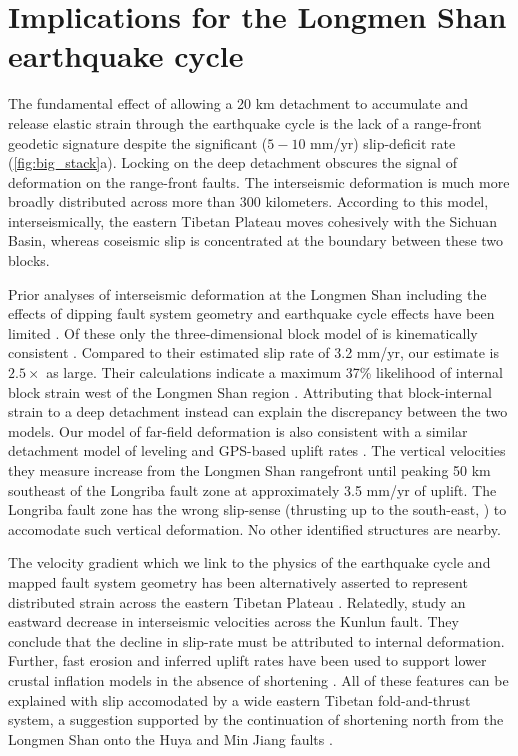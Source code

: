 \documentclass[12pt]{article}
\begin{document}
\section{Implications for the Longmen Shan earthquake cycle}
The fundamental effect of allowing a 20 km detachment to accumulate and release elastic strain through the earthquake cycle is the lack of a range-front geodetic signature despite the significant ($5-10$ mm/yr) slip-deficit rate (\ref{fig:big_stack}a). Locking on the deep detachment obscures the signal of deformation on the range-front faults. The interseismic deformation is much more broadly distributed across more than 300 kilometers. According to this model, interseismically, the eastern Tibetan Plateau moves cohesively with the Sichuan Basin, whereas coseismic slip is concentrated at the boundary between these two blocks.

Prior analyses of interseismic deformation at the Longmen Shan including the effects of dipping fault system geometry and earthquake cycle effects have been limited \citep{Loveless2011, Qi2011, Hao2014}. Of these only the three-dimensional block model of \citet{Loveless2011} is kinematically consistent \citep{minster87,mccaffrey02,Meade2005}. Compared to their estimated slip rate of 3.2 mm/yr, our estimate is $2.5 \times$ as large.  Their calculations indicate a maximum 37\% likelihood of internal block strain west of the Longmen Shan region \citep{Loveless2011}. Attributing that block-internal strain to a deep detachment instead can explain the discrepancy between the two models. Our model of far-field deformation is also consistent with a similar detachment model of leveling and GPS-based uplift rates \citep{Hao2014}. The vertical velocities they measure increase from the Longmen Shan rangefront until peaking 50 km southeast of the Longriba fault zone at approximately 3.5 mm/yr of uplift. The Longriba fault zone has the wrong slip-sense (thrusting up to the south-east, \citep{Ren2013}) to accomodate such vertical deformation. No other identified structures are nearby. 

The velocity gradient which we link to the physics of the earthquake cycle and mapped fault system geometry has been alternatively asserted to represent distributed strain across the eastern Tibetan Plateau \citep{Royden2008}. Relatedly, \citet{kirby07} study an eastward decrease in interseismic velocities across the Kunlun fault. They conclude that the decline in slip-rate must be attributed to internal deformation. Further, fast erosion and inferred uplift rates have been used to support lower crustal inflation models in the absence of shortening \citep{Kirby2003}. All of these features can be explained with slip accomodated by a wide eastern Tibetan fold-and-thrust system, a suggestion supported by the continuation of shortening north from the Longmen Shan onto the Huya \citep{kirby00} and Min Jiang faults \citep{Chen1994}. 
\end{document}
